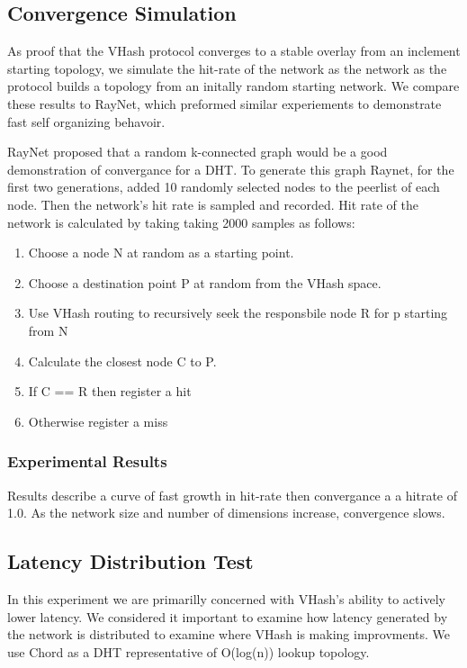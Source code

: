 \documentclass{IEEEtran}
\begin{document}
\subsection{Convergence Simulation}
As proof that the VHash protocol converges to a stable overlay from an inclement starting topology, we simulate the hit-rate of the network as the network as the protocol builds a topology from an initally random starting network.
We compare these results to RayNet, which preformed similar experiements to demonstrate fast self organizing behavoir.

RayNet proposed that a random k-connected graph would be a good demonstration of convergance for a DHT.
To generate this graph Raynet, for the first two generations, added 10 randomly selected nodes to the peerlist of each node.
Then the network's hit rate is sampled and recorded.
Hit rate of the network is calculated by taking taking 2000 samples as follows:
\begin{enumerate}
            \item{Choose a node N at random as a starting point.}
            \item{Choose a destination point P at random from the VHash space.}
            \item{Use VHash routing to recursively seek the responsbile node R for p starting from N}
            \item{Calculate the closest node C to P.}
            \item{If C == R then register a hit}
            \item{Otherwise register a miss}
\end{enumerate}

\subsubsection{Experimental Results}
Results describe a curve of fast growth in hit-rate then convergance a a hitrate of 1.0.
As the network size and number of dimensions increase, convergence slows.


\subsection{Latency Distribution Test}
In this experiment we are primarilly concerned with VHash's ability to actively lower latency.
We considered it important to examine how latency generated by the network is distributed to examine where VHash is making improvments.
We use Chord as a DHT representative of O(log(n)) lookup topology.
\end{document}
